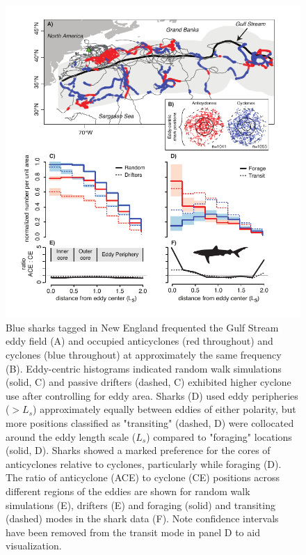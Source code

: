 \begin{figure}[htbp]
\centering
\includegraphics{images/C5_Fig1.pdf}
\caption{Blue sharks tagged in New England frequented the Gulf Stream eddy field (A) and occupied anticyclones (red throughout) and cyclones (blue throughout) at approximately the same frequency (B). Eddy-centric histograms indicated random walk simulations (solid, C) and passive drifters (dashed, C) exhibited higher cyclone use after controlling for eddy area. Sharks (D) used eddy peripheries ($>L_s$) approximately equally between eddies of either polarity, but more positions classified as "transiting" (dashed, D) were collocated around the eddy length scale ($L_s$) compared to "foraging" locations (solid, D). Sharks showed a marked preference for the cores of anticyclones relative to cyclones, particularly while foraging (D). The ratio of anticyclone (ACE) to cyclone (CE) positions across different regions of the eddies are shown for random walk simulations (E), drifters (E) and foraging (solid) and transiting (dashed) modes in the shark data (F). Note confidence intervals have been removed from the transit mode in panel D to aid visualization.}
\label{fig:c5f1}
\end{figure}

\clearpage

